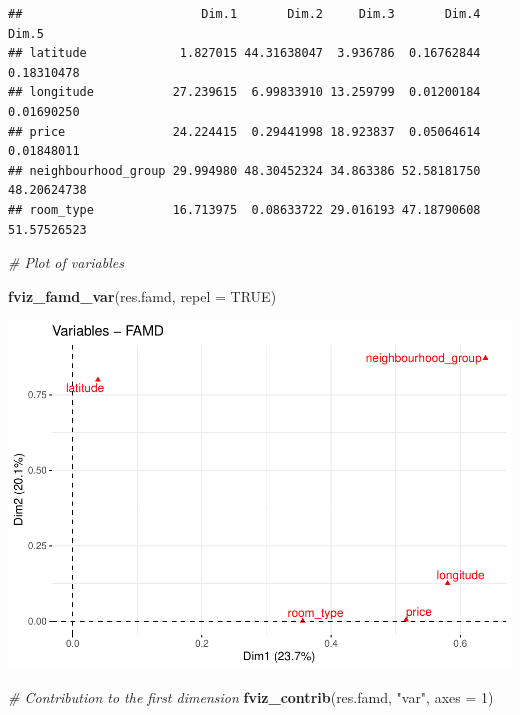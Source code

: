 \documentclass[
]{article}
\newenvironment{Shaded}{\begin{snugshade}}{\end{snugshade}}
\newcommand{\CommentTok}[1]{\textcolor[rgb]{0.56,0.35,0.01}{\textit{#1}}}
\newcommand{\DataTypeTok}[1]{\textcolor[rgb]{0.13,0.29,0.53}{#1}}
\newcommand{\DecValTok}[1]{\textcolor[rgb]{0.00,0.00,0.81}{#1}}
\newcommand{\KeywordTok}[1]{\textcolor[rgb]{0.13,0.29,0.53}{\textbf{#1}}}
\newcommand{\NormalTok}[1]{#1}
\newcommand{\OtherTok}[1]{\textcolor[rgb]{0.56,0.35,0.01}{#1}}
\newcommand{\StringTok}[1]{\textcolor[rgb]{0.31,0.60,0.02}{#1}}
\begin{document}
\begin{verbatim}
##                         Dim.1       Dim.2     Dim.3       Dim.4       Dim.5
## latitude             1.827015 44.31638047  3.936786  0.16762844  0.18310478
## longitude           27.239615  6.99833910 13.259799  0.01200184  0.01690250
## price               24.224415  0.29441998 18.923837  0.05064614  0.01848011
## neighbourhood_group 29.994980 48.30452324 34.863386 52.58181750 48.20624738
## room_type           16.713975  0.08633722 29.016193 47.18790608 51.57526523
\end{verbatim}

\begin{Shaded}
\begin{Highlighting}[]
\CommentTok{# Plot of variables}

\KeywordTok{fviz_famd_var}\NormalTok{(res.famd, }\DataTypeTok{repel =} \OtherTok{TRUE}\NormalTok{)}
\end{Highlighting}
\end{Shaded}

\includegraphics{project-code_files/figure-latex/unnamed-chunk-38-1.pdf}

\begin{Shaded}
\begin{Highlighting}[]
\CommentTok{# Contribution to the first dimension}
\KeywordTok{fviz_contrib}\NormalTok{(res.famd, }\StringTok{"var"}\NormalTok{, }\DataTypeTok{axes =} \DecValTok{1}\NormalTok{)}
\end{Highlighting}
\end{Shaded}
\end{document}
